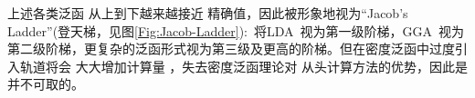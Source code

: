 上述{各类}泛函%
从上到下越来越接近%
精确值，因此被形象地视为``Jacob's Ladder''(登天梯，见图\ref{Fig:Jacob-Ladder}):~将\textrm{LDA~}视为第一级阶梯，\textrm{GGA~}视为第二级阶梯，更复杂的泛函形式视为第三级及更高的阶梯。\cite{PRL91-146401_2003}但在密度泛函中过度引入轨道将会%
{大大增加}计算量%
，失去密度泛函理论对%
从头计算方法的优势，因此是{并}不可取的。
%
%
